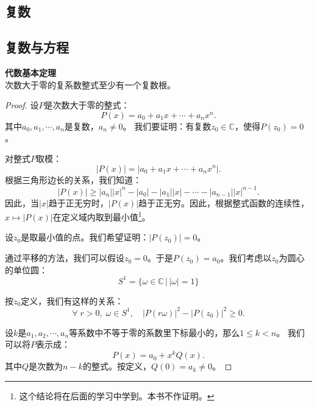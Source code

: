 \documentclass[12pt,UTF8,fontset=none]{ctexbook}
\begin{document}


\begin{appendix}

\chapter{复数}

\section{复数与方程}

\begin{tm}{\textbf{代数基本定理}}
    \mbox{} \\
    次数大于零的复系数整式至少有一个复数根。
\end{tm}

\begin{proof}
    设$P$是次数大于零的整式：
    $$ P(x) = a_0 + a_1 x + \cdots + a_n x^n.$$
    其中$a_0, a_1, \cdots , a_n$是复数，$a_n \neq 0$。
    我们要证明：有复数$z_0\in\mathbb{C}$，使得$P(z_0) = 0$。

    对整式$P$取模：
    $$ |P(x)| = |a_0 + a_1 x + \cdots + a_n x^n|. $$
    根据三角形边长的关系，我们知道：
    $$ |P(x)| \geqslant |a_n| |x|^n - |a_0| - |a_1||x| - \cdots - |a_{n-1}| |x|^{n-1}. $$
    因此，当$|x|$趋于正无穷时，$|P(x)|$趋于正无穷。因此，根据整式函数的连续性，$x\mapsto |P(x)|$在定义域内取到最小值\footnote{这个结论将在后面的学习中学到。本书不作证明。}。

    设$z_0$是取最小值的点。我们希望证明：$|P(z_0)| = 0$。
    
    通过平移的方法，我们可以假设$z_0 = 0$。于是$P(z_0) = a_0$。我们考虑以$z_0$为圆心的单位圆：
    $$ S^1 = \{\omega\in\mathbb{C} \, | \, |\omega| = 1\}$$

    按$z_0$定义，我们有这样的关系：
    $$ \forall \; r > 0, \; \omega \in S^1,\quad  |P(r\omega)|^2 - |P(z_0)|^2 \geqslant 0. $$ 

    设$k$是$a_1, a_2, \cdots, a_n$等系数中不等于零的系数里下标最小的，那么$1\leqslant k < n$。
    我们可以将$P$表示成：
    $$ P(x) = a_0 + x^k Q(x). $$
    其中$Q$是次数为$n - k$的整式。按定义，$Q(0) = a_k \neq 0$。


\end{proof}
\end{appendix}
\end{document}

